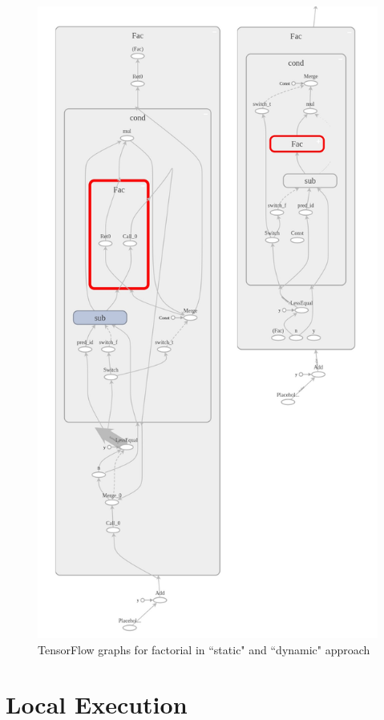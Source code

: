 \documentclass[ack,preface]{dithesis}
\begin{document}
\begin{figure}
\centering
\includegraphics[scale=0.42]{figures/tf_factorial}
\caption{TensorFlow graphs for factorial in ``static" and ``dynamic" approach}
\end{figure}



    \section{Local Execution}
\end{document}
